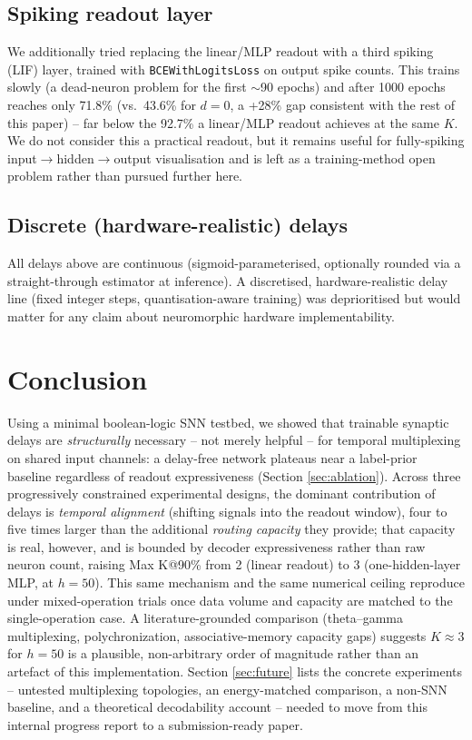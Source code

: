\documentclass[conference]{IEEEtran}
\begin{document}
\subsection{Spiking readout layer}
We additionally tried replacing the linear/MLP readout with a third spiking (LIF) layer,
trained with \texttt{BCEWithLogitsLoss} on output spike counts. This trains slowly (a
dead-neuron problem for the first $\sim$90 epochs) and after 1000 epochs reaches only
71.8\% (vs.\ 43.6\% for $d{=}0$, a +28\% gap consistent with the rest of this paper) --
far below the 92.7\% a linear/MLP readout achieves at the same $K$. We do not consider
this a practical readout, but it remains useful for fully-spiking
input$\to$hidden$\to$output visualisation and is left as a training-method open problem
rather than pursued further here.

\subsection{Discrete (hardware-realistic) delays}
All delays above are continuous (sigmoid-parameterised, optionally rounded via a
straight-through estimator at inference). A discretised, hardware-realistic delay line
(fixed integer steps, quantisation-aware training) was deprioritised but would matter for
any claim about neuromorphic hardware implementability.

\section{Conclusion}

Using a minimal boolean-logic SNN testbed, we showed that trainable synaptic delays are
\emph{structurally} necessary -- not merely helpful -- for temporal multiplexing on
shared input channels: a delay-free network plateaus near a label-prior baseline
regardless of readout expressiveness (Section \ref{sec:ablation}). Across three
progressively constrained experimental designs, the dominant contribution of delays is
\emph{temporal alignment} (shifting signals into the readout window), four to five times
larger than the additional \emph{routing capacity} they provide; that capacity is real,
however, and is bounded by decoder expressiveness rather than raw neuron count, raising
Max K@90\% from 2 (linear readout) to 3 (one-hidden-layer MLP, at $h{=}50$). This same
mechanism and the same numerical ceiling reproduce under mixed-operation trials once
data volume and capacity are matched to the single-operation case. A literature-grounded
comparison (theta--gamma multiplexing, polychronization, associative-memory capacity
gaps) suggests $K{\approx}3$ for $h{=}50$ is a plausible, non-arbitrary order of
magnitude rather than an artefact of this implementation. Section \ref{sec:future} lists
the concrete experiments -- untested multiplexing topologies, an energy-matched
comparison, a non-SNN baseline, and a theoretical decodability account -- needed to move
from this internal progress report to a submission-ready paper.



\end{document}
